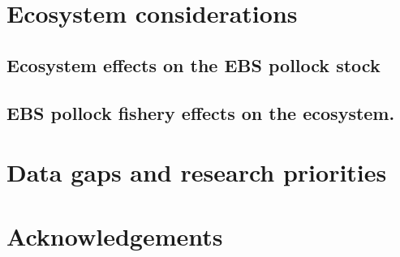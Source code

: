 \documentclass[11pt,]{article}
\begin{document}
\hypertarget{ecosystem-considerations}{%
\section{Ecosystem considerations}\label{ecosystem-considerations}}

\hypertarget{ecosystem-effects-on-the-ebs-pollock-stock}{%
\subsection{Ecosystem effects on the EBS pollock
stock}\label{ecosystem-effects-on-the-ebs-pollock-stock}}

\hypertarget{ebs-pollock-fishery-effects-on-the-ecosystem.}{%
\subsection{EBS pollock fishery effects on the
ecosystem.}\label{ebs-pollock-fishery-effects-on-the-ecosystem.}}

\hypertarget{data-gaps-and-research-priorities}{%
\section{Data gaps and research
priorities}\label{data-gaps-and-research-priorities}}

\hypertarget{acknowledgements}{%
\section{Acknowledgements}\label{acknowledgements}}
\end{document}
